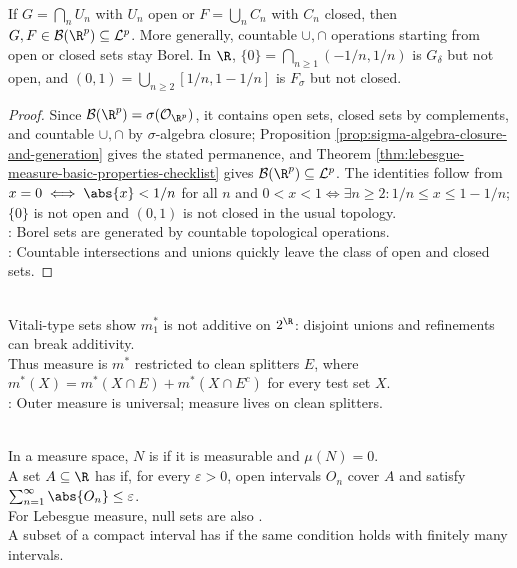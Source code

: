 \begin{proposition} \label{prop:borel-hierarchy-first-examples} \\
If $G=\bigcap_nU_n$ with $U_n$ open or $F=\bigcup_nC_n$ with $C_n$ closed, then $G,F\in\mathcal{B}(\R^p)\subseteq\mathcal{L}^p$. More generally, countable $\cup,\cap$ operations starting from open or closed sets stay Borel. In $\R$, $\{0\}=\bigcap_{n\geq1}(-1/n,1/n)$ is $G_\delta$ but not open, and $(0,1)=\bigcup_{n\geq2}[1/n,1-1/n]$ is $F_\sigma$ but not closed.
\begin{proof}
Since $\mathcal{B}(\R^p)=\sigma(\mathcal{O}_{\R^p})$, it contains open sets, closed sets by complements, and countable $\cup,\cap$ by $\sigma$-algebra closure; Proposition \ref{prop:sigma-algebra-closure-and-generation} gives the stated permanence, and Theorem \ref{thm:lebesgue-measure-basic-properties-checklist} gives $\mathcal{B}(\R^p)\subseteq\mathcal{L}^p$. The identities follow from $x=0\iff \abs{x}<1/n$ for all $n$ and $0<x<1\iff \exists n\geq2:1/n\leq x\leq1-1/n$; $\{0\}$ is not open and $(0,1)$ is not closed in the usual topology.\\
: Borel sets are generated by countable topological operations.\\
: Countable intersections and unions quickly leave the class of open and closed sets.
\end{proof}
\end{proposition}

\begin{perspective} \label{per:outer-measure-not-enough} \\
Vitali-type sets show $m_1^\ast$ is not additive on $2^\R$: disjoint unions and refinements can break additivity.\\
Thus measure is $m^\ast$ restricted to clean splitters $E$, where $m^\ast(X)=m^\ast(X\cap E)+m^\ast(X\cap E^c)$ for every test set $X$.\\
: Outer measure is universal; measure lives on clean splitters.
\end{perspective}

\begin{definition} \label{def:null-sets-and-real-line-measure-zero} \\
In a measure space, $N$ is  if it is measurable and $\mu(N)=0$.\\
A set $A\subseteq\R$ has  if, for every $\varepsilon>0$, open intervals $O_n$ cover $A$ and satisfy $\sum_{n=1}^{\infty}\abs{O_n}\leq\varepsilon$.\\
For Lebesgue measure, null sets are also .\\
A subset of a compact interval has  if the same condition holds with finitely many intervals.
\end{definition}

